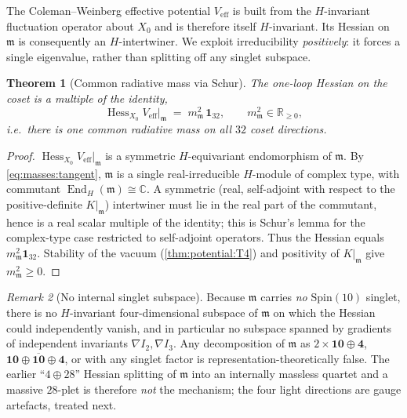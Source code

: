 \documentclass[11pt]{article}
\theoremstyle{plain}
\newtheorem{theorem}{Theorem}[section]
\theoremstyle{definition}
\theoremstyle{remark}
\newtheorem{remark}[theorem]{Remark}
\begin{document}
The Coleman--Weinberg effective potential $V_{\mathrm{eff}}$ is built from the
$H$-invariant fluctuation operator about $X_{0}$ and is therefore itself
$H$-invariant. Its Hessian on $\mathfrak m$ is consequently an
$H$-intertwiner. We exploit irreducibility \emph{positively}: it forces a
single eigenvalue, rather than splitting off any singlet subspace.

\begin{theorem}[Common radiative mass via Schur]\label{thm:masses:schur}
The one-loop Hessian on the coset is a multiple of the identity,
\begin{equation}\label{eq:masses:schur}
  \operatorname{Hess}_{X_{0}}V_{\mathrm{eff}}\big|_{\mathfrak m}
  \;=\; m_{\mathfrak m}^{2}\,\mathbf 1_{32},
  \qquad m_{\mathfrak m}^{2}\in\mathbb R_{\ge 0},
\end{equation}
i.e.\ there is one common radiative mass on all $32$ coset directions.
\end{theorem}

\begin{proof}
$\operatorname{Hess}_{X_{0}}V_{\mathrm{eff}}|_{\mathfrak m}$ is a symmetric
$H$-equivariant endomorphism of $\mathfrak m$. By \eqref{eq:masses:tangent},
$\mathfrak m$ is a single real-irreducible $H$-module of complex type, with
commutant $\operatorname{End}_{H}(\mathfrak m)\cong\mathbb C$. A symmetric (real,
self-adjoint with respect to the positive-definite $K|_{\mathfrak m}$)
intertwiner must lie in the real part of the commutant, hence is a real scalar
multiple of the identity; this is Schur's lemma for the complex-type case
restricted to self-adjoint operators. Thus the Hessian equals
$m_{\mathfrak m}^{2}\mathbf 1_{32}$. Stability of the vacuum
(\autoref{thm:potential:T4}) and positivity of $K|_{\mathfrak m}$ give
$m_{\mathfrak m}^{2}\ge 0$.
\end{proof}

\begin{remark}[No internal singlet subspace]\label{rmk:masses:nosinglet}
Because $\mathfrak m$ carries \emph{no} $\mathrm{Spin}(10)$ singlet, there is no
$H$-invariant four-dimensional subspace of $\mathfrak m$ on which the Hessian
could independently vanish, and in particular no subspace spanned by gradients
of independent invariants $\nabla I_{2},\nabla I_{3}$. Any decomposition of
$\mathfrak m$ as $2\times\mathbf{10}\oplus\mathbf 4$, $\mathbf{10}\oplus
\overline{\mathbf{10}}\oplus\mathbf 4$, or with any singlet factor is
representation-theoretically false. The earlier ``$4\oplus 28$'' Hessian
splitting of $\mathfrak m$ into an internally massless quartet and a massive
$28$-plet is therefore \emph{not} the mechanism; the four light directions are
gauge artefacts, treated next.
\end{remark}
\end{document}
